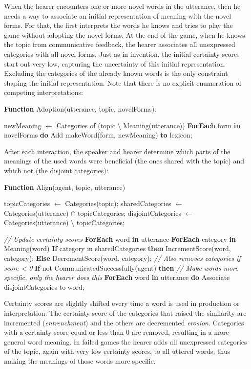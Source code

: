  When the hearer encounters one or more novel
words in the utterance, then he needs a way to associate an initial
representation of meaning with the novel forms. For that, the first
interprets the words he knows and tries to play the game without
adopting the novel forms. At the end of the game, when he knows the
topic from communicative feedback, the hearer associates all
unexpressed categories with all novel forms. Just as in invention, the
initial certainty scores start out very low, capturing the uncertainty
of this initial representation. Excluding the categories of the
already known words is the only constraint shaping the initial
representation. Note that there is no explicit enumeration of
competing interpretations:

\begin{verbatim+}
\textbf{Function} Adoption(utterance, topic, novelForms):

newMeaning $\leftarrow$ Categories of (topic $\setminus$  Meaning(utterance))
\textbf{ForEach} form \textbf{in} novelForms \textbf{do} 
    Add makeWord(form, newMeaning) \textbf{to} lexicon; 
\end{verbatim+}


 After each interaction, the speaker and hearer
determine which parts of the meanings of the used words were
beneficial (the ones shared with the topic) and which not (the
disjoint categories): 

\begin{verbatim+}
\textbf{Function} Align(agent, topic, utterance)

topicCategories $\leftarrow$ Categories(topic);
sharedCategories $\leftarrow$ Categories(utterance) $\cap$ topicCategories;
disjointCategories $\leftarrow$ Categories(utterance) $\setminus$ topicCategories;
 
\textit{// Update certainty scores}
\textbf{ForEach} word \textbf{in} utterance 
   \textbf{ForEach} category \textbf{in} Meaning(word) 
      \textbf{If} category in sharedCategories
      \textbf{then} IncrementScore(word, category);
      \textbf{Else} DecrementScore(word, category); 
           \textit{// Also removes categories if score < 0} 
\textbf{If} not CommunicatedSuccessfully(agent) 
\textbf{then} \textit{// Make words more specific, only the hearer does this} 
   \textbf{ForEach} word \textbf{in} utterance 
      \textbf{do} Associate disjointCategories to word;
\end{verbatim+}

Certainty scores are slightly shifted every time a word is used in
production or interpretation. The certainty score of the categories
that raised the similarity are incremented (\emph{entrenchment}) and
the others are decremented \emph{erosion}. Categories with a certainty
score equal or less than 0 are removed, resulting in a more general
word meaning. In failed games the hearer adds all unexpressed
categories of the topic, again with very low certainty scores, to all
uttered words, thus making the meanings of those words more specific.



